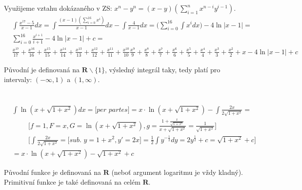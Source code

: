 \documentclass[a4paper]{article}
\begin{document}
\vspace{-4cm}
{\fontsize{12}{15}\selectfont \hspace{-0.5cm}}

\section{}
Využijeme vztahu dokázaného v ZS: $x^n - y^n = (x-y)(\sum_{i=1}^{n} x^{n-i}y^{i-1})$.
\begin{align*}
	&\int \frac{x^{17}-5}{x-1} dx = \int \frac{(x-1)(\sum_{i=0}^{16} x^{i})}{x-1}dx  - \int \frac{4}{x-1} dx = \bigg(\sum_{i=0}^{16} \int x^{i} dx \bigg) - 4\ln|x-1| =  \\
	& \sum_{i=0}^{16} \frac{x^{i+1}}{i+1} - 4\ln|x-1| +c = \\
	& \frac{x^{17}}{17}+\frac{x^{16}}{16}+\frac{x^{15}}{15}+\frac{x^{14}}{14}+\frac{x^{13}}{13}+\frac{x^{12}}{12}+\frac{x^{11}}{11}+\frac{x^{10}}{10}\frac{x^{9}}{9}+\frac{x^{8}}{8}+\frac{x^{7}}{7}+\frac{x^{6}}{6}+\frac{x^{5}}{5}+\frac{x^{4}}{4}+\frac{x^{3}}{3}+\frac{x^{2}}{2}+x- 4\ln|x-1| +c
\end{align*}

Původní je definovaná na $\mathbf{R} \backslash \{1\}$, výsledný integrál taky, tedy platí pro intervaly: $(-\infty, 1)$ a $(1, \infty)$.


\section{}
\begin{align*}
	& \int \ln(x+\sqrt{1+x^2}) dx = \textit{[per partes]} = x\cdot \ln(x+\sqrt{1+x^2}) - \int \frac{2x}{2\sqrt{1+x^2}}  = \hspace{6cm}\\
	& \hspace{1cm} \bigg[f = 1, F = x, G = \ln(x+\sqrt{1+x^2}), g = \frac{1+\frac{x}{\sqrt{1+x^2} }}{x+\sqrt{1+x^2}} = \frac{1}{\sqrt{1+x^2}}\bigg] \\
	& \hspace{1cm} \bigg[\int \frac{2x}{2\sqrt{1+x^2}} = \textit{[sub. $y =1+x^2, y'=2x$]} = \frac{1}{2} \int y^{-\frac{1}{2}} dy= 2 y^{\frac{1}{2}} +c = \sqrt{1+x^2} +c\bigg]  \\ 
	& = x\cdot \ln(x+\sqrt{1+x^2}) - \sqrt{1+x^2} + c 
\end{align*}

Původní funkce je definovaná na $\mathbf{R}$ (neboť argument logaritmu je vždy kladný). Primitivní funkce je také definovaná na celém $\mathbf{R}$.
\end{document}
